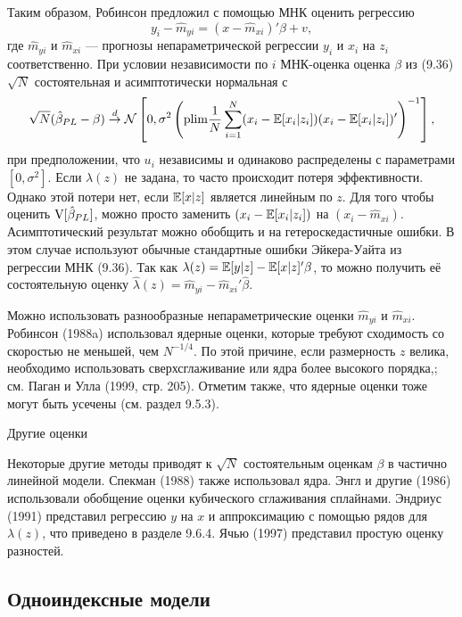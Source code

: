 Таким образом, Робинсон предложил с помощью МНК оценить регрессию
\begin{equation}
y_i - \hat{m}_{yi} = (x - \hat{m}_{xi})'\beta + v,
\end{equation}
где $\hat{m}_{yi}$ и $\hat{m}_{xi}$ --- прогнозы непараметрической регрессии $y_i$ и $x_i$ на $z_i$ соответственно. При условии независимости по $i$ МНК-оценка оценка $\beta$ из (9.36) $\sqrt{N}$ состоятельная и асимптотически нормальная с 
\[
\sqrt{N}(\hat{\beta}_{PL} - \beta) \stackrel{d}{\rightarrow} \mathcal{N} \left[ 0, \sigma^2 \left( \mathrm{plim } \frac{1}{N} \sum_{i=1}^N (x_i - \mathbb{E}[x_i|z_i])(x_i - \mathbb{E}[x_i|z_i])' \right)^{-1} \right],
\]
при предположении, что $u_i$ независимы и одинаково распределены с параметрами $[0,\sigma^2]$. Если $\lambda(z)$ не задана, то часто происходит потеря эффективности. Однако этой потери нет, если $\mathbb{E}[x|z]$ является линейным по $z$. Для того чтобы оценить $\mathrm{V}[\hat{\beta}_{PL}]$, можно просто заменить $(x_i - \mathbb{E}[x_i|z_i])$ на $(x_i - \hat{m}_{xi})$. Асимптотический результат можно обобщить и на гетероскедастичные ошибки. В этом случае используют обычные стандартные ошибки Эйкера-Уайта из регрессии МНК (9.36). Так как $\lambda(z) = \mathbb{E}[y|z] - \mathbb{E}[x|z]'\beta$, то можно получить её состоятельную оценку $\hat{\lambda}(z) = \hat{m}_{yi} - \hat{m}_{xi}'\hat{\beta}$.

Можно использовать разнообразные непараметрические оценки $\hat{m}_{yi}$ и $\hat{m}_{xi}$. Робинсон (1988a) использовал ядерные оценки, которые требуют сходимость со скоростью не меньшей, чем $N^{-1/4}$. По этой причине, если размерность $z$ велика, необходимо использовать сверхсглаживание или ядра более высокого порядка,; см. Паган и Улла (1999, стр. 205). Отметим также, что ядерные оценки тоже могут быть усечены (см. раздел 9.5.3).

\begin{center}
Другие оценки
\end{center}

Некоторые другие методы приводят к $\sqrt{N}$ состоятельным оценкам $\beta$ в частично линейной модели. Спекман (1988) также использовал ядра. Энгл и другие (1986) использовали обобщение оценки кубического сглаживания сплайнами. Эндриус (1991) представил регрессию $y$ на $x$ и аппроксимацию с помощью рядов для $\lambda(z)$, что приведено в разделе 9.6.4. Ячью (1997) представил простую оценку разностей.

\subsection{Одноиндексные модели}

